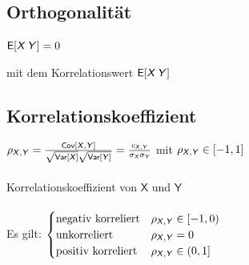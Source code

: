 \documentclass[german,color,6pt]{latex4ei/latex4ei_sheet}
\DeclareMathOperator{\W}{\textit{W}}				%
\DeclareMathOperator{\U}{\textit{U}}				%
\begin{document}
\begin{sectionbox}
	\subsection{Orthogonalität}
	
	\begin{emphbox}
		$\E[\X\Y] = 0$
	\end{emphbox}
	mit dem Korrelationswert $\E[\X\Y]$
	
\end{sectionbox}

\begin{sectionbox}
	\subsection{Korrelationskoeffizient}
	$\rho_{\X,\Y} = \frac{\Cov[\X,\Y]}{\sqrt{\Var[\X]} \sqrt{\Var[\Y]}} = \frac{c_{\X,\Y}}{\sigma_{\X} \sigma_{\Y}}$ mit $\rho_{\X, \Y} \in [-1,1]$\\ \\
	Korrelationskoeffizient von $\mathsf X$ und $\mathsf Y$\\\\
	Es gilt: $\begin{cases}\text{negativ korreliert} & \rho_{\mathsf{\X,\Y}}\in [-1,0) \\ 
	\text{unkorreliert} & \rho_{\mathsf{\X,\Y}}=0 \\ 
	\text{positiv korreliert} & \rho_{\mathsf{\X,\Y}}\in (0,1]\end{cases}$
\end{sectionbox}






\end{document}

